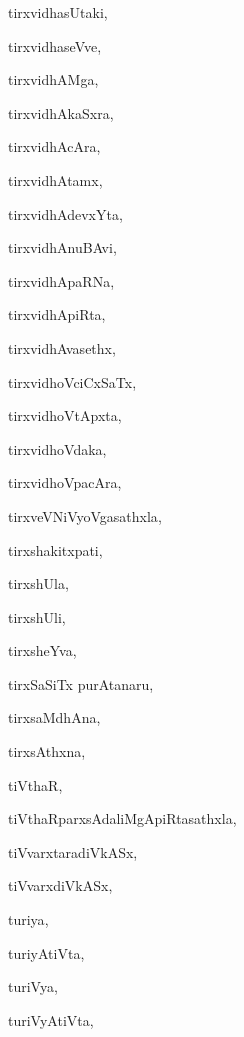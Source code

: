 \begin{multicols}{2}
{tirxvidhasUtaki}, \pageref{tirxvidhasUtaki}

{tirxvidhaseVve}, \pageref{tirxvidhaseVve}

{tirxvidhAMga}, \pageref{tirxvidhAMga}

{tirxvidhAkaSxra}, \pageref{tirxvidhAkaSxra}

{tirxvidhAcAra}, \pageref{tirxvidhAcAra}

{tirxvidhAtamx}, \pageref{tirxvidhAtamx}

{tirxvidhAdevxYta}, \pageref{tirxvidhAdevxYta}

{tirxvidhAnuBAvi}, \pageref{tirxvidhAnuBAvi}

{tirxvidhApaRNa}, \pageref{tirxvidhApaRNa}

{tirxvidhApiRta}, \pageref{tirxvidhApiRta}

{tirxvidhAvasethx}, \pageref{tirxvidhAvasethx}

{tirxvidhoVciCxSaTx}, \pageref{tirxvidhoVciCxSaTx}

{tirxvidhoVtApxta}, \pageref{tirxvidhoVtApxta}

{tirxvidhoVdaka}, \pageref{tirxvidhoVdaka}

{tirxvidhoVpacAra}, \pageref{tirxvidhoVpacAra}

{tirxveVNiVyoVgasathxla}, \pageref{tirxveVNiVyoVgasathxla}

{tirxshakitxpati}, \pageref{tirxshakitxpati}

{tirxshUla}, \pageref{tirxshUla}

{tirxshUli}, \pageref{tirxshUli}

{tirxsheYva}, \pageref{tirxsheYva}

{tirxSaSiTx purAtanaru}, \pageref{tirxSaSiTx purAtanaru}

{tirxsaMdhAna}, \pageref{tirxsaMdhAna}

{tirxsAthxna}, \pageref{tirxsAthxna}

{tiVthaR}, \pageref{tiVthaR}

{tiVthaRparxsAdaliMgApiRtasathxla}, \pageref{tiVthaRparxsAdaliMgApiRtasathxla}

{tiVvarxtaradiVkASx}, \pageref{tiVvarxtaradiVkASx}

{tiVvarxdiVkASx}, \pageref{tiVvarxdiVkASx}

{turiya}, \pageref{turiya}

{turiyAtiVta}, \pageref{turiyAtiVta}

{turiVya}, \pageref{turiVya}

{turiVyAtiVta}, \pageref{turiVyAtiVta}


\end{multicols}
